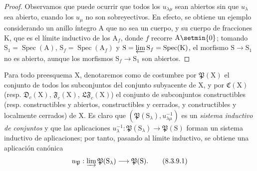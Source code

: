 \begin{proof}
Observamos que puede ocurrir que todos los $u_{\lambda\mu}$ sean abiertos sin que $u_\lambda$ sea abierto, cuando los $u_\mu$ no son sobreyectivos.
En efecto, se obtiene un ejemplo considerando un anillo íntegro $\mathrm{A}$ que no sea un cuerpo, y su cuerpo de fracciones $\mathrm{K}$, que es el límite inductivo de los $\mathrm{A}_f$, donde $f$ recorre $\mathrm{A}\setmin\{0\}$; tomando $\mathrm{S}_1=\operatorname{Spec}(\mathrm{A})$, $\mathrm{S}_f=\operatorname{Spec}(\mathrm{A}_f)$ y $\mathrm{S}=\varprojlim\mathrm{S}_f=\operatorname{Spec}(\mathrm{K})$, el morfismo $\mathrm{S}\to\mathrm{S}_1$ no es abierto, aunque los morfismos $\mathrm{S}_f\to\mathrm{S}_1$ son abiertos.
\end{proof}

\begin{env}[8.3.9]
\label{IV.8.3.9}
Para todo preesquema $\mathrm{X}$, denotaremos como de costumbre por $\mathfrak{P}(\mathrm{X})$ el conjunto de todos los subconjuntos del conjunto subyacente de $\mathrm{X}$, y por $\mathfrak{C}(\mathrm{X})$ (resp. $\mathfrak{D}_c(\mathrm{X})$, $\mathfrak{F}_c(\mathrm{X})$, $\mathfrak{LF}_c(\mathrm{X})$) el conjunto de subconjuntos constructibles (resp. constructibles y abiertos, constructibles y cerrados, y constructibles y localmente cerrados) de $\mathrm{X}$.
Es claro que $(\mathfrak{P}(\mathrm{S}_\lambda),u_{\lambda\mu}^{-1})$ es un \emph{sistema inductivo de conjuntos} y que las aplicaciones $u_\lambda^{-1}:\mathfrak{P}(\mathrm{S}_\lambda)\to\mathfrak{P}(\mathrm{S})$ forman un sistema inductivo de aplicaciones; por tanto, pasando al límite inductivo, se obtiene una aplicación canónica
\begin{equation}
  u_\mathfrak{P}:\varinjlim\mathfrak{P}(\mathrm{S}_\lambda)\to\mathfrak{P}(\mathrm{S}).
  \tag{8.3.9.1}
\label{IV.8.3.9.1}
\end{equation}


\end{env}
